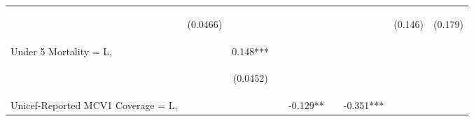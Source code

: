 \documentclass[]{article}
\begin{document}
\begin{center}
\begin{tabular}{lcccccccc}
\vspace{4pt} & \begin{footnotesize}(0.0466)\end{footnotesize} & \begin{footnotesize}\end{footnotesize} & \begin{footnotesize}\end{footnotesize} & \begin{footnotesize}\end{footnotesize} & \begin{footnotesize}\end{footnotesize} & \begin{footnotesize}\end{footnotesize} & \begin{footnotesize}(0.146)\end{footnotesize} & \begin{footnotesize}(0.179)\end{footnotesize} \\
Under 5 Mortality = L, &  & 0.148*** &  &  &  &  &  &  \\
\vspace{4pt} & \begin{footnotesize}\end{footnotesize} & \begin{footnotesize}(0.0452)\end{footnotesize} & \begin{footnotesize}\end{footnotesize} & \begin{footnotesize}\end{footnotesize} & \begin{footnotesize}\end{footnotesize} & \begin{footnotesize}\end{footnotesize} & \begin{footnotesize}\end{footnotesize} & \begin{footnotesize}\end{footnotesize} \\
Unicef-Reported MCV1 Coverage = L, &  &  &  & -0.129** &  & -0.351*** &  &  \\

\end{tabular}
\end{center}
\end{document}
